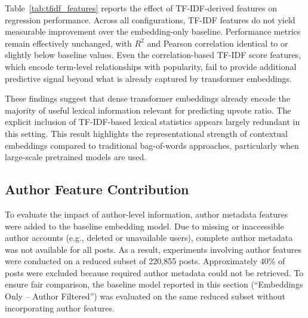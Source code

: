 Table~\ref{tab:tfidf_features} reports the effect of TF-IDF-derived features on regression performance. Across all configurations, TF-IDF features do not yield measurable improvement over the embedding-only baseline. Performance metrics remain effectively unchanged, with $R^2$ and Pearson correlation identical to or slightly below baseline values. Even the correlation-based TF-IDF score features, which encode term-level relationships with popularity, fail to provide additional predictive signal beyond what is already captured by transformer embeddings.

These findings suggest that dense transformer embeddings already encode the majority of useful lexical information relevant for predicting upvote ratio. The explicit inclusion of TF-IDF-based lexical statistics appears largely redundant in this setting. This result highlights the representational strength of contextual embeddings compared to traditional bag-of-words approaches, particularly when large-scale pretrained models are used.


\subsection{Author Feature Contribution}

To evaluate the impact of author-level information, author metadata features were added to the baseline embedding model. Due to missing or inaccessible author accounts (e.g., deleted or unavailable users), complete author metadata was not available for all posts.
As a result, experiments involving author features were conducted on a reduced subset of 220,855 posts. Approximately 40\% of posts were excluded because required author metadata could not be retrieved.
To ensure fair comparison, the baseline model reported in this section (``Embeddings Only – Author Filtered'') was evaluated on the same reduced subset without incorporating author features.

